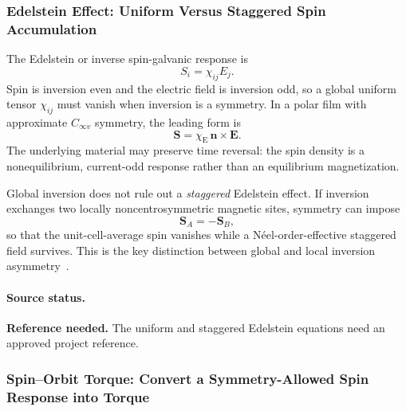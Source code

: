\subsubsection{Edelstein Effect: Uniform Versus Staggered Spin Accumulation}

The Edelstein or inverse spin-galvanic response is
\begin{equation}
    S_i=\chi_{ij}E_j.
    \label{eq:symmetry-edelstein}
\end{equation}
Spin is inversion even and the electric field is inversion odd, so a global
uniform tensor $\chi_{ij}$ must vanish when inversion is a symmetry.  In a
polar film with approximate $C_{\infty v}$ symmetry, the leading form is
\begin{equation}
    \mathbf{S}=\chi_{\mathrm E}\,\mathbf{n}\times\mathbf{E}.
    \label{eq:edelstein-isotropic}
\end{equation}
The underlying material may preserve time reversal: the spin density is a
nonequilibrium, current-odd response rather than an equilibrium magnetization.

Global inversion does not rule out a \emph{staggered} Edelstein effect.  If
inversion exchanges two locally noncentrosymmetric magnetic sites, symmetry
can impose
\begin{equation}
    \mathbf{S}_A=-\mathbf{S}_B,
    \label{eq:staggered-edelstein}
\end{equation}
so that the unit-cell-average spin vanishes while a N\'eel-order-effective
staggered field survives.  This is the key distinction between global and
local inversion asymmetry~\cite{zelezny2017sot,watanabe2018afm-switching,
    manchon2019sot}.

\paragraph{Source status.}
\textbf{Reference needed.}  The uniform and staggered Edelstein equations need
an approved project reference.

\subsubsection{Spin--Orbit Torque: Convert a Symmetry-Allowed Spin Response
    into Torque}


